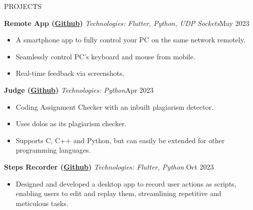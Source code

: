 \documentclass{resume}
\begin{document}

\begin{rSection}{PROJECTS}

    \textbf{Remote App (\href{https://github.com/ShivanshuKGupta/remote}{Github})} \textit{Technologies: Flutter, Python, UDP Sockets}\hfill May 2023
    \begin{itemize}
        \itemsep -3pt {}
        \item A smartphone app to fully control your PC on the same network remotely.
        \item Seamlessly control PC's keyboard and mouse from mobile.
        \item Real-time feedback via screenshots.
    \end{itemize}

    \textbf{Judge (\href{https://github.com/ShivanshuKGupta/Judge}{Github})} \textit{Technologies: Python}\hfill Apr 2023
    \begin{itemize}
        \itemsep -3pt {}
        \item Coding Assignment Checker with an inbuilt plagiarism detector.
        \item Uses dolos as its plagiarism checker.
        \item Supports C, C++ and Python, but can easily be extended for other programming languages.

    \end{itemize}

    \textbf{Steps Recorder (\href{https://github.com/ShivanshuKGupta/Steps-Recorder}{Github})} \textit{Technologies: Flutter, Python} \hfill Oct 2023
    \begin{itemize}
        \itemsep -3pt {}
        \item Designed and developed a desktop app to record user actions as scripts, enabling users to edit and replay them, streamlining repetitive and meticulous tasks.
    \end{itemize}


\end{rSection}
\end{document}
